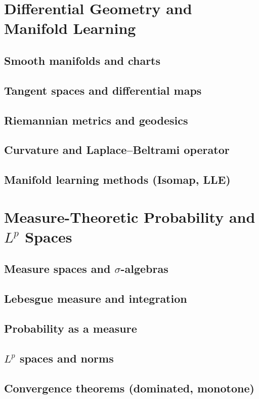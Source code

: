 \section{Differential Geometry and Manifold Learning}
\subsection{Smooth manifolds and charts}
\subsection{Tangent spaces and differential maps}
\subsection{Riemannian metrics and geodesics}
\subsection{Curvature and Laplace–Beltrami operator}
\subsection{Manifold learning methods (Isomap, LLE)}

\section{Measure-Theoretic Probability and $L^p$ Spaces}
\subsection{Measure spaces and $\sigma$-algebras}
\subsection{Lebesgue measure and integration}
\subsection{Probability as a measure}
\subsection{$L^p$ spaces and norms}
\subsection{Convergence theorems (dominated, monotone)}
